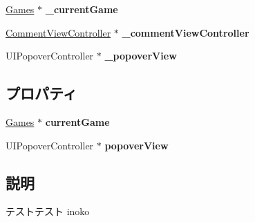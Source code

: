 \begin{DoxyCompactItemize}
\item 
\hypertarget{interface_abstract_record_view_controller_a83688601809e3c6d2bbb1fed20a6bb52}{
\hyperlink{interface_games}{Games} $\ast$ {\bfseries \_\-currentGame}}
\label{interface_abstract_record_view_controller_a83688601809e3c6d2bbb1fed20a6bb52}

\item 
\hypertarget{interface_abstract_record_view_controller_abed47fdca333426ec912c7f3ca670f95}{
\hyperlink{interface_comment_view_controller}{CommentViewController} $\ast$ {\bfseries \_\-commentViewController}}
\label{interface_abstract_record_view_controller_abed47fdca333426ec912c7f3ca670f95}

\item 
\hypertarget{interface_abstract_record_view_controller_afd7973557d4a016cd6c0cca348664ea2}{
UIPopoverController $\ast$ {\bfseries \_\-popoverView}}
\label{interface_abstract_record_view_controller_afd7973557d4a016cd6c0cca348664ea2}

\end{DoxyCompactItemize}
\subsection*{プロパティ}
\begin{DoxyCompactItemize}
\item 
\hypertarget{interface_abstract_record_view_controller_a340c4197ab534a13a4bfdc6681486092}{
\hyperlink{interface_games}{Games} $\ast$ {\bfseries currentGame}}
\label{interface_abstract_record_view_controller_a340c4197ab534a13a4bfdc6681486092}

\item 
\hypertarget{interface_abstract_record_view_controller_a7e8eab3134a3d4178d9c95782314efe0}{
UIPopoverController $\ast$ {\bfseries popoverView}}
\label{interface_abstract_record_view_controller_a7e8eab3134a3d4178d9c95782314efe0}

\end{DoxyCompactItemize}


\subsection{説明}
テストテスト  inoko 

